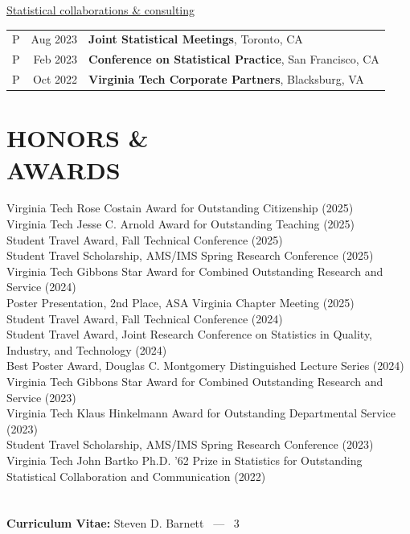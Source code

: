 \documentclass[margin,line]{res}
\begin{document}
\begin{resume}
\underline{Statistical collaborations \& consulting}\\
\begin{tabular}{lrl}
P\quad\quad & Aug 2023 & {\bf Joint Statistical Meetings}, Toronto, CA \\
P\quad\quad & Feb 2023 & {\bf Conference on Statistical Practice}, San Francisco, CA \\
P\quad\quad & Oct 2022 & {\bf Virginia Tech Corporate Partners}, Blacksburg, VA \\
\end{tabular}

\section{\bf HONORS \& \\ AWARDS}
Virginia Tech Rose Costain Award for Outstanding Citizenship (2025) \\
Virginia Tech Jesse C. Arnold Award for Outstanding Teaching (2025) \\
Student Travel Award, Fall Technical Conference (2025) \\
Student Travel Scholarship, AMS/IMS Spring Research Conference (2025) \\
Virginia Tech Gibbons Star Award for Combined Outstanding Research and Service (2024) \\
Poster Presentation, 2nd Place, ASA Virginia Chapter Meeting (2025) \\
Student Travel Award, Fall Technical Conference (2024) \\
Student Travel Award, Joint Research Conference on Statistics in Quality, Industry, and Technology (2024) \\
Best Poster Award, Douglas C. Montgomery Distinguished Lecture Series (2024) \\
Virginia Tech Gibbons Star Award for Combined Outstanding Research and Service (2023) \\
Virginia Tech Klaus Hinkelmann Award for Outstanding Departmental Service (2023) \\
Student Travel Scholarship, AMS/IMS Spring Research Conference (2023) \\
Virginia Tech John Bartko Ph.D. ’62 Prize in Statistics for Outstanding Statistical Collaboration and Communication (2022)

\pagebreak
\section{}
\hfill {\bf Curriculum Vitae:} Steven D. Barnett \  --- \  3


\end{resume}
\end{document}
